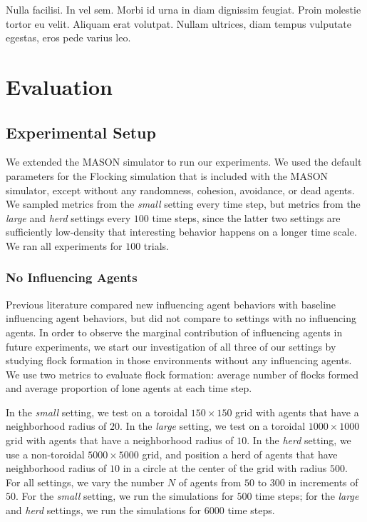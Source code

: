 \begin{savequote}[75mm]
Nulla facilisi. In vel sem. Morbi id urna in diam dignissim feugiat. Proin molestie tortor eu velit. Aliquam erat volutpat. Nullam ultrices, diam tempus vulputate egestas, eros pede varius leo.
\end{savequote}

\chapter{Evaluation}
\label{ch:evaluation}

\section{Experimental Setup}

We extended the MASON simulator to run our experiments.\cite{luke05mason}
We used the default parameters for the Flocking simulation that is included
with the MASON simulator, except without any randomness, cohesion, avoidance,
or dead agents.
We sampled metrics from the \textit{small} setting every time step, but metrics
from the \textit{large} and \textit{herd} settings every $100$ time steps,
since the latter two settings are sufficiently low-density that interesting
behavior happens on a longer time scale.
We ran all experiments for $100$ trials.

\subsection{No Influencing Agents}
Previous literature compared new influencing agent behaviors with baseline
influencing agent behaviors, but did not compare to settings with no
influencing agents.
In order to observe the marginal contribution of influencing agents
in future experiments, we start our investigation of all three of our settings
by studying flock formation in those environments without any influencing
agents.
We use two metrics to evaluate flock formation: average number of flocks
formed and average proportion of lone agents at each time step.

In the \textit{small} setting, we test on a toroidal $150\times150$ grid with
agents that have a neighborhood radius of $20$.
In the \textit{large} setting, we test on a toroidal $1000\times1000$ grid with
agents that have a neighborhood radius of $10$.
In the \textit{herd} setting, we use a non-toroidal $5000\times5000$ grid, and
position a herd of agents that have neighborhood radius of $10$ in a circle at
the center of the grid with radius $500$.
For all settings, we vary the number $N$ of agents from $50$ to $300$ in
increments of $50$.
For the \textit{small} setting, we run the simulations for $500$ time steps;
for the \textit{large} and \textit{herd} settings, we run the simulations for
$6000$ time steps.

